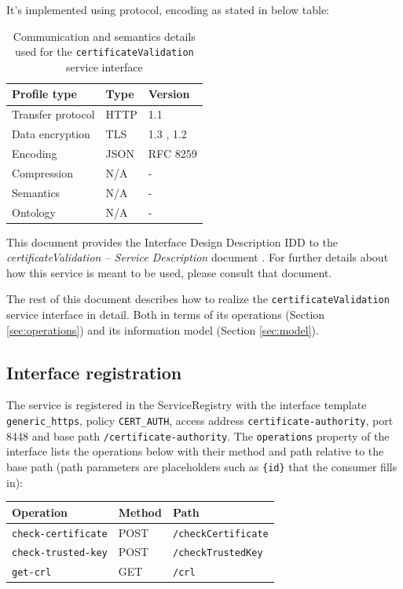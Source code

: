 \documentclass[a4paper]{arrowhead}
\begin{document}
It's implemented using protocol, encoding as stated in below table:
\begin{table}[ht!]
  \centering
  \begin{tabular}{|l|l|l|}
    \hline
    \rowcolor{gray!33} Profile type & Type & Version \\ \hline
    Transfer protocol & HTTP & 1.1 \cite{rfc9112} \\ \hline
    Data encryption & TLS & 1.3 \cite{rfc8446}, 1.2 \cite{rfc5246} \\ \hline
    Encoding & JSON & RFC 8259 \cite{rfc8259} \\ \hline
    Compression & N/A & - \\ \hline
    Semantics & N/A & - \\ \hline
    Ontology & N/A & - \\ \hline
  \end{tabular}
  \caption{Communication and semantics details used for the \texttt{certificate\allowbreak{}Validation} service interface}
  \label{tab:comunication_semantics_profile}
\end{table}

This document provides the Interface Design Description IDD to the \textit{certificateValidation -- Service Description} document \cite{cau-certificateValidation-sd}.
For further details about how this service is meant to be used, please consult that document.

The rest of this document describes how to realize the \texttt{certificate\allowbreak{}Validation} service
interface in detail. Both in terms of its operations (Section \ref{sec:operations}) and its information model (Section \ref{sec:model}).

\subsection{Interface registration}

The service is registered in the ServiceRegistry with the interface template \texttt{generic\_\allowbreak{}https}, policy \texttt{CERT\_\allowbreak{}AUTH}, access address \texttt{certificate-\allowbreak{}authority}, port 8448 and base path \texttt{/\allowbreak{}certificate-\allowbreak{}authority}. The \texttt{operations} property of the interface lists the operations below with their method and path relative to the base path (path parameters are placeholders such as \texttt{\{id\}} that the consumer fills in):

\noindent\begin{longtable}{| p{5.2cm} | p{1.6cm} | p{8.4cm} |} \hline
\rowcolor{gray!33} Operation & Method & Path \\ \hline \endhead
\texttt{check-\allowbreak{}certificate} & POST & \texttt{/\allowbreak{}checkCertificate} \\ \hline
\texttt{check-\allowbreak{}trusted-\allowbreak{}key} & POST & \texttt{/\allowbreak{}checkTrustedKey} \\ \hline
\texttt{get-\allowbreak{}crl} & GET & \texttt{/\allowbreak{}crl} \\ \hline
\end{longtable}
\end{document}
